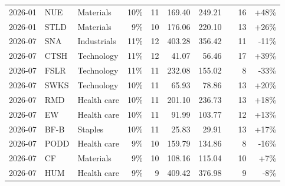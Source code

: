 \documentclass[11pt,a4paper]{article}
\begin{document}
{\begin{longtable}{l l l r r r r r r r}
2026-01 & NUE & Materials & 10\% & 11 & 169.40 & 249.21 &  & 16 & +48\% \\
2026-01 & STLD & Materials & 9\% & 10 & 176.06 & 220.10 &  & 13 & +26\% \\
2026-07 & SNA & Industrials & 11\% & 12 & 403.28 & 356.42 &  & 11 & -11\% \\
2026-07 & CTSH & Technology & 11\% & 12 & 41.07 & 56.46 &  & 17 & +39\% \\
2026-07 & FSLR & Technology & 11\% & 11 & 232.08 & 155.02 &  & 8 & -33\% \\
2026-07 & SWKS & Technology & 10\% & 11 & 65.93 & 78.86 &  & 13 & +20\% \\
2026-07 & RMD & Health care & 10\% & 11 & 201.10 & 236.73 &  & 13 & +18\% \\
2026-07 & EW & Health care & 10\% & 11 & 91.99 & 103.77 &  & 12 & +13\% \\
2026-07 & BF-B & Staples & 10\% & 11 & 25.83 & 29.91 &  & 13 & +17\% \\
2026-07 & PODD & Health care & 9\% & 10 & 159.79 & 134.86 &  & 8 & -16\% \\
2026-07 & CF & Materials & 9\% & 10 & 108.16 & 115.04 &  & 10 & +7\% \\
2026-07 & HUM & Health care & 9\% & 9 & 409.42 & 376.98 &  & 9 & -8\% \\
\hline
\end{longtable}}
\end{document}
